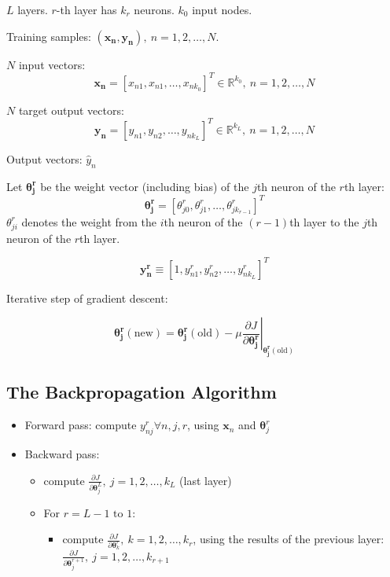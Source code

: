 \documentclass{report}
\begin{document}
$L$ layers.
$r$-th layer has $k_r$ neurons.
$k_0$ input nodes.

Training samples: $(\symbf{x_n}, \symbf{y_n}),\ n=1, 2, \ldots, N$.

$N$ input vectors:
\[\symbf{x_n} = [x_{n 1}, x_{n 1}, \ldots , x_{n k_0}]^T \in \mathbb{R}^{k_0},\ n = 1, 2, \ldots, N\]

$N$ target output vectors:
\[\symbf{y_n} = [y_{n 1}, y_{n 2}, \ldots , y_{n k_L}]^T \in \mathbb{R}^{k_L},\ n = 1, 2, \ldots, N\]

Output vectors: $\hat y_n$

Let $\symbf{\theta_j^r}$ be the weight vector (including bias) of the $j$th neuron of the $r$th layer:
\[\symbf{\theta_j^r} = [\theta_{j0}^r, \theta_{j1}^r, \ldots, \theta_{jk_{r-1}}^r]^T\]
$\theta_{ji}^r$ denotes the weight from the $i$th neuron of the $(r-1)$th layer to the $j$th neuron of the $r$th layer.

\[\symbf{y_n^r} \equiv [1, y_{n 1}^r, y_{n 2}^r, \ldots, y_{n k_L}^r]^T\]

Iterative step of gradient descent:

\[\symbf{\theta_j^r}(\text{new}) = \symbf{\theta_j^r}(\text{old}) - \mu \left.\frac{\partial J}{\partial \symbf{\theta_j^r}} \right|_{\symbf{\theta_j^r}(\text{old})}\]

\subsection*{The Backpropagation Algorithm}

\begin{mdframed}
\begin{itemize}
	\item Forward pass: compute $y_{nj}^r \forall n, j, r$, using $\symbf{x}_n$ and $\symbf{\theta}_j^r$ 
	\item Backward pass:
	\begin{itemize}
		\item compute $\frac{\partial J}{\partial \symbf{\theta}_j^L},\ j=1, 2, \ldots, k_L$ (last layer)
		\item For $r = L-1 \text{ to } 1$:
		\begin{itemize}
			\item compute $\frac{\partial J}{\partial \symbf{\theta}_k^r},\ k=1, 2, \ldots, k_r$, using the results of the previous layer: $\frac{\partial J}{\partial \symbf{\theta}_j^{r+1}},\ j=1, 2, \ldots, k_{r+1}$
		\end{itemize}
	\end{itemize}
\end{itemize}
\end{mdframed}
\end{document}

